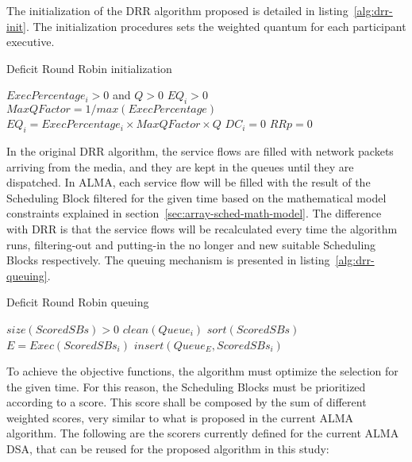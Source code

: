 The initialization of the DRR algorithm proposed is detailed in listing~\ref{alg:drr-init}. The initialization procedures sets the weighted quantum for each participant executive.

\begin{algorithm}                     
\caption{Deficit Round Robin initialization}          
\label{alg:drr-init}                   
\begin{algorithmic}                    
    \REQUIRE $ExecPercentage_i > 0$ and $Q > 0$
    \ENSURE $EQ_i > 0$
    \STATE $MaxQFactor = 1 / max(ExecPercentage)$
    \STATE $EQ_i = ExecPercentage_i\times MaxQFactor \times Q$
    \STATE $DC_i = 0$ 
    \STATE $RRp = 0$ 
    \ENDFOR
\end{algorithmic}
\end{algorithm}

In the original DRR algorithm, the service flows are filled with network packets arriving from the media, and they are kept in the queues until they are dispatched. In ALMA, each service flow will be filled with the result of the Scheduling Block filtered for the given time based on the mathematical model constraints explained in section~\ref{sec:array-sched-math-model}. The difference with DRR is that the service flows will be recalculated every time the algorithm runs, filtering-out and putting-in the no longer and new suitable Scheduling Blocks respectively. The queuing mechanism is presented in listing~\ref{alg:drr-queuing}.

\begin{algorithm}                     
\caption{Deficit Round Robin queuing}          
\label{alg:drr-queuing}                   
\begin{algorithmic}                    
    \REQUIRE $size(ScoredSBs) > 0$
    \STATE $clean(Queue_i)$
    \ENDFOR
    \STATE $sort(ScoredSBs)$
    \STATE $E = Exec(ScoredSBs_i)$
    \STATE $insert(Queue_E, ScoredSBs_i)$
    \ENDFOR
\end{algorithmic}
\end{algorithm}

To achieve the objective functions, the algorithm must optimize the selection for the given time. For this reason, the Scheduling Blocks must be prioritized according to a score. This score shall be composed by the sum of different weighted scores, very similar to what is proposed in the current ALMA algorithm. The following are the scorers currently defined for the current ALMA DSA, that can be reused for the proposed algorithm in this study:

